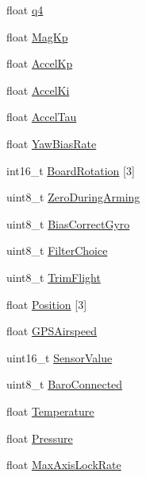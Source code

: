 \begin{DoxyCompactItemize}
\item 
float \hyperlink{struct____attribute_____a265c0771cf94dc277b9e048b5ac0ea32}{q4}
\item 
float \hyperlink{struct____attribute_____a0fcb26c8eb0483ca855e889ad10c2333}{\-Mag\-Kp}
\item 
float \hyperlink{struct____attribute_____a981e932927ebbd0fb7c5c85c08e21e44}{\-Accel\-Kp}
\item 
float \hyperlink{struct____attribute_____a424d6c5ce64662f3dc33822b57ec6bb0}{\-Accel\-Ki}
\item 
float \hyperlink{struct____attribute_____a0148fbf5871044e0ae14ed50be24a234}{\-Accel\-Tau}
\item 
float \hyperlink{struct____attribute_____abe69aa6e76067d6be2fb7ba24fd94501}{\-Yaw\-Bias\-Rate}
\item 
int16\-\_\-t \hyperlink{struct____attribute_____a5147508dbc9acee939608efdf4581d55}{\-Board\-Rotation} \mbox{[}3\mbox{]}
\item 
uint8\-\_\-t \hyperlink{struct____attribute_____adf3787c76989853c1a9c679b90367e7d}{\-Zero\-During\-Arming}
\item 
uint8\-\_\-t \hyperlink{struct____attribute_____a112b0f2217f918b8c50970ab2fc4b509}{\-Bias\-Correct\-Gyro}
\item 
uint8\-\_\-t \hyperlink{struct____attribute_____a05c15fc8f9c8b1bb1cb0d430e91f8917}{\-Filter\-Choice}
\item 
uint8\-\_\-t \hyperlink{struct____attribute_____a15b22f4f1045d631030da99243000d5e}{\-Trim\-Flight}
\item 
float \hyperlink{struct____attribute_____a16a9c3cd0cc40d544c8eef5231a78ca4}{\-Position} \mbox{[}3\mbox{]}
\item 
float \hyperlink{struct____attribute_____a48a824ca0a456909909e5b04287a600f}{\-G\-P\-S\-Airspeed}
\item 
uint16\-\_\-t \hyperlink{struct____attribute_____ac2da95bc62782424db35159750ffd306}{\-Sensor\-Value}
\item 
uint8\-\_\-t \hyperlink{struct____attribute_____af518dbbc7f1a8cb5d1541d3cc4724376}{\-Baro\-Connected}
\item 
float \hyperlink{struct____attribute_____acc426b62d2b496740d85adea21c1f9eb}{\-Temperature}
\item 
float \hyperlink{struct____attribute_____a33eaa721e15f34cc3fa2400492af646c}{\-Pressure}
\item 
float \hyperlink{struct____attribute_____a14f899c6f6607918d81c51a29d671929}{\-Max\-Axis\-Lock\-Rate}
\item 

\end{DoxyCompactItemize}
